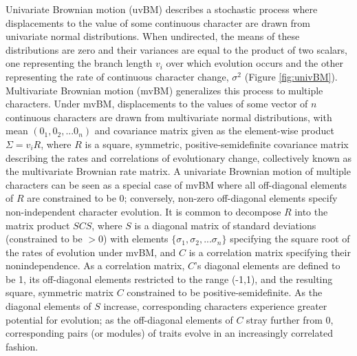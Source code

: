 \documentclass[10pt, twocolumn, twoside]{article}
\begin{document}
Univariate Brownian motion (uvBM) describes a stochastic process where displacements to the value of some continuous character are drawn from univariate normal distributions. When undirected, the means of these distributions are zero and their variances are equal to the product of two scalars, one representing the branch length $v_i$ over which evolution occurs and the other representing the rate of continuous character change, $\sigma^2$ (Figure \ref{fig:univBM}). Multivariate Brownian motion (mvBM) generalizes this process to multiple characters. Under mvBM, displacements to the values of some vector of $n$ continuous characters are drawn from multivariate normal distributions, with mean $(0_1,0_2,...0_n)$ and covariance matrix given as the element-wise product $\Sigma = v_iR$, where $R$ is a square, symmetric, positive-semidefinite covariance matrix describing the rates and correlations of evolutionary change, collectively known as the multivariate Brownian rate matrix. A univariate Brownian motion of multiple characters can be seen as a special case of mvBM where all off-diagonal elements of $R$ are constrained to be 0; conversely, non-zero off-diagonal elements specify non-independent character evolution. It is common to decompose $R$ into the matrix product $SCS$, where $S$ is a diagonal matrix of standard deviations (constrained to be $>0$) with elements $\{\sigma_1, \sigma_2, ... \sigma_n\}$ specifying the square root of the rates of evolution under mvBM, and $C$ is a correlation matrix specifying their nonindependence. As a correlation matrix, $C$'s diagonal elements are defined to be 1, its off-diagonal elements restricted to the range (-1,1), and the resulting square, symmetric matrix $C$ constrained to be positive-semidefinite. As the diagonal elements of $S$ increase, corresponding characters experience greater potential for evolution; as the off-diagonal elements of $C$ stray further from 0, corresponding pairs (or modules) of traits evolve in an increasingly correlated fashion.
\end{document}
